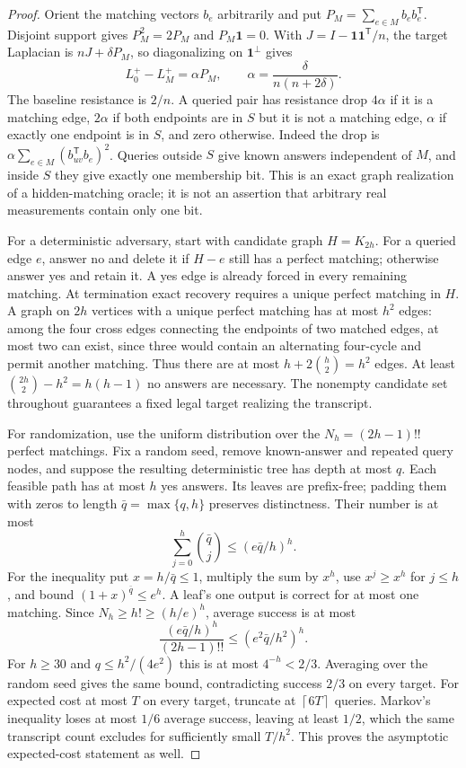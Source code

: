 \documentclass[11pt,letterpaper]{article}
\newcommand{\one}{\mathbf 1}
\newcommand{\ceil}[1]{\left\lceil #1\right\rceil}
\begin{document}
\begin{proof}
Orient the matching vectors $b_e$ arbitrarily and put $P_M=\sum_{e\in M}b_eb_e^{\mathsf T}$. Disjoint support gives $P_M^2=2P_M$ and $P_M\one=0$. With $J=I-\one\one^{\mathsf T}/n$, the target Laplacian is $nJ+\delta P_M$, so diagonalizing on $\one^\perp$ gives
\[
 L_0^+-L_M^+=\alpha P_M,\qquad \alpha=\frac{\delta}{n(n+2\delta)}.
\]
The baseline resistance is $2/n$. A queried pair has resistance drop $4\alpha$ if it is a matching edge, $2\alpha$ if both endpoints are in $S$ but it is not a matching edge, $\alpha$ if exactly one endpoint is in $S$, and zero otherwise. Indeed the drop is $\alpha\sum_{e\in M}(b_{uv}^{\mathsf T}b_e)^2$. Queries outside $S$ give known answers independent of $M$, and inside $S$ they give exactly one membership bit. This is an exact graph realization of a hidden-matching oracle; it is not an assertion that arbitrary real measurements contain only one bit.

For a deterministic adversary, start with candidate graph $H=K_{2h}$. For a queried edge $e$, answer no and delete it if $H-e$ still has a perfect matching; otherwise answer yes and retain it. A yes edge is already forced in every remaining matching. At termination exact recovery requires a unique perfect matching in $H$. A graph on $2h$ vertices with a unique perfect matching has at most $h^2$ edges: among the four cross edges connecting the endpoints of two matched edges, at most two can exist, since three would contain an alternating four-cycle and permit another matching. Thus there are at most $h+2\binom h2=h^2$ edges. At least $\binom{2h}2-h^2=h(h-1)$ no answers are necessary. The nonempty candidate set throughout guarantees a fixed legal target realizing the transcript.

For randomization, use the uniform distribution over the $N_h=(2h-1)!!$ perfect matchings. Fix a random seed, remove known-answer and repeated query nodes, and suppose the resulting deterministic tree has depth at most $q$. Each feasible path has at most $h$ yes answers. Its leaves are prefix-free; padding them with zeros to length $\bar q=\max\{q,h\}$ preserves distinctness. Their number is at most
\[
 \sum_{j=0}^h\binom{\bar q}j\le(e\bar q/h)^h.
\]
For the inequality put $x=h/\bar q\le1$, multiply the sum by $x^h$, use $x^j\ge x^h$ for $j\le h$, and bound $(1+x)^{\bar q}\le e^h$. A leaf's one output is correct for at most one matching. Since $N_h\ge h!\ge(h/e)^h$, average success is at most
\[
 \frac{(e\bar q/h)^h}{(2h-1)!!}\le(e^2\bar q/h^2)^h.
\]
For $h\ge30$ and $q\le h^2/(4e^2)$ this is at most $4^{-h}<2/3$. Averaging over the random seed gives the same bound, contradicting success $2/3$ on every target. For expected cost at most $T$ on every target, truncate at $\ceil{6T}$ queries. Markov's inequality loses at most $1/6$ average success, leaving at least $1/2$, which the same transcript count excludes for sufficiently small $T/h^2$. This proves the asymptotic expected-cost statement as well.
\end{proof}
\end{document}
